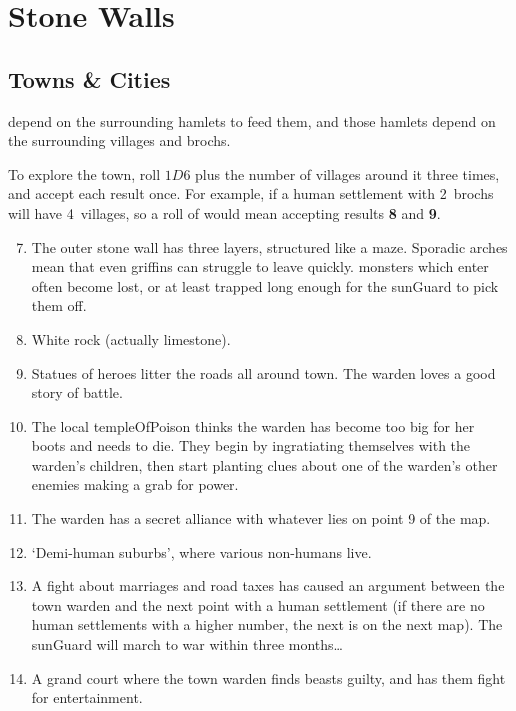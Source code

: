 \section{Stone Walls}
\label{mapStrangePlaces}

\begin{multicols}{2}

\subsection{Towns \& Cities}
\label{mapTown}
depend on the surrounding hamlets to feed them, and those hamlets depend on the surrounding \glspl{village} and \glspl{broch}.

To explore the town, roll $1D6$ plus the number of \glspl{village} around it three times, and accept each result once.
For example, if a human settlement with 2~\glspl{broch} will have 4~\glspl{village}, so a roll of    would mean accepting results \textbf{8} and \textbf{9}.

\begin{enumerate}
\setcounter{enumi}{6}
  \item
  The outer stone wall has three layers, structured like a maze.
  Sporadic arches mean that even griffins can struggle to leave quickly.
  \Glspl{monster} which enter often become lost, or at least trapped long enough for the \gls{sunGuard} to pick them off.
  \item
  White rock (actually limestone).
  \item
  Statues of heroes litter the roads all around town.
  The \gls{warden} loves a good story of battle.
  \item
  The local \gls{templeOfPoison} thinks the \gls{warden} has become too big for her boots and needs to die.
  They begin by ingratiating themselves with the \gls{warden}'s children, then start planting clues about one of the \gls{warden}'s other enemies making a grab for power.
  \item
  The \gls{warden} has a secret alliance with whatever lies on point 9 of the map.
  \item
  `Demi-human suburbs', where various non-humans live.
  \item
  A fight about marriages and road taxes has caused an argument between the town \gls{warden} and the next point with a human settlement (if there are no human settlements with a higher number, the next is on the next map).
  The \gls{sunGuard} will march to war within three months\ldots
  \item
  A grand \gls{court} where the town \gls{warden} finds beasts guilty, and has them fight for entertainment.


\end{enumerate}
\end{multicols}
